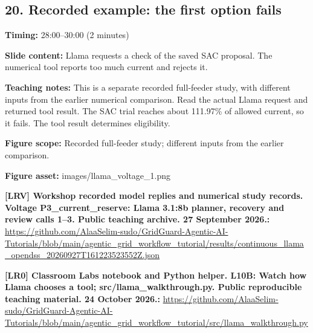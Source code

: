 \documentclass[10pt,letterpaper]{article}
\begin{document}
\subsection*{20. Recorded example: the first option fails}
\textbf{Timing:} 28:00--30:00 (2 minutes)\par
\textbf{Slide content:} Llama requests a check of the saved SAC proposal.
The numerical tool reports too much current and rejects it.\par
\textbf{Teaching notes:} This is a separate recorded full-feeder study, with different inputs from the earlier numerical comparison. Read the actual Llama request and returned tool result. The SAC trial reaches about 111.97\% of allowed current, so it fails. The tool result determines eligibility.\par
\textbf{Figure scope:} Recorded full-feeder study; different inputs from the earlier comparison.\par
\textbf{Figure asset:} images/llama\_voltage\_1.png\par
\textbf{[LRV] Workshop recorded model replies and numerical study records. Voltage P3\_current\_reserve: Llama 3.1:8b planner, recovery and review calls 1--3. Public teaching archive. 27 September 2026.:} \href{https://github.com/AlaaSelim-sudo/GridGuard-Agentic-AI-Tutorials/blob/main/agentic_grid_workflow_tutorial/results/continuous_llama_opendss_20260927T161223523552Z.json}{\small\ttfamily https:/\allowbreak{}/\allowbreak{}github.\allowbreak{}com/\allowbreak{}AlaaSelim-\allowbreak{}sudo/\allowbreak{}GridGuard-\allowbreak{}Agentic-\allowbreak{}AI-\allowbreak{}Tutorials/\allowbreak{}blob/\allowbreak{}main/\allowbreak{}agentic\_\allowbreak{}grid\_\allowbreak{}workflow\_\allowbreak{}tutorial/\allowbreak{}results/\allowbreak{}continuous\_\allowbreak{}llama\_\allowbreak{}opendss\_\allowbreak{}20260927T161223523552Z.\allowbreak{}json}\par
\textbf{[LR0] Classroom Labs notebook and Python helper. L10B: Watch how Llama chooses a tool; src/llama\_walkthrough.py. Public reproducible teaching material. 24 October 2026.:} \href{https://github.com/AlaaSelim-sudo/GridGuard-Agentic-AI-Tutorials/blob/main/agentic_grid_workflow_tutorial/src/llama_walkthrough.py}{\small\ttfamily https:/\allowbreak{}/\allowbreak{}github.\allowbreak{}com/\allowbreak{}AlaaSelim-\allowbreak{}sudo/\allowbreak{}GridGuard-\allowbreak{}Agentic-\allowbreak{}AI-\allowbreak{}Tutorials/\allowbreak{}blob/\allowbreak{}main/\allowbreak{}agentic\_\allowbreak{}grid\_\allowbreak{}workflow\_\allowbreak{}tutorial/\allowbreak{}src/\allowbreak{}llama\_\allowbreak{}walkthrough.\allowbreak{}py}\par
\par\medskip
\end{document}
